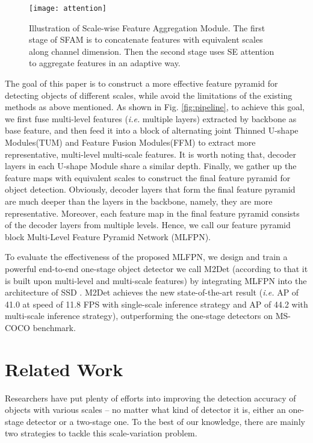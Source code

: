 \documentclass[letterpaper]{article} \usepackage{aaai18}  \usepackage{times}  \usepackage{helvet}  \usepackage{courier}  \usepackage{url}  \usepackage{graphicx}
\begin{document}
\begin{figure*}
\centering
\texttt{[image: attention]}
\caption{Illustration of Scale-wise Feature Aggregation Module. The first stage of SFAM is to concatenate features with equivalent scales along channel dimension. Then the second stage uses SE attention to aggregate features in an adaptive way.}
\label{fig:attention}
\end{figure*}


The goal of this paper is to construct a more effective feature pyramid for detecting objects of different scales, while avoid the limitations of the existing methods as above mentioned. As shown in Fig. \ref{fig:pipeline}, to achieve this goal, we first fuse multi-level features (\textit{i.e.} multiple layers) extracted by backbone as base feature, and then feed it into a block of alternating joint Thinned U-shape Modules(TUM) and Feature Fusion Modules(FFM) to extract more representative, multi-level multi-scale features. 
It is worth noting that, decoder layers in each U-shape Module share a similar depth. Finally, we gather up the feature maps with equivalent scales to construct the final feature pyramid for object detection. Obviously, decoder layers that form the final feature pyramid are much deeper than the layers in the backbone, namely, they are more representative. Moreover, each feature map in the final feature pyramid consists of the decoder layers from multiple levels. Hence, we call our feature pyramid block Multi-Level Feature Pyramid Network (MLFPN).

To evaluate the effectiveness of the proposed MLFPN, we design and train a powerful end-to-end one-stage object detector we call M2Det (according to that it is built upon multi-level and multi-scale features) by integrating MLFPN into the architecture of SSD \cite{LiuAESRFB16}. M2Det achieves the new state-of-the-art result (\textit{i.e.} AP of 41.0 at speed of 11.8 FPS with single-scale inference strategy and AP of 44.2 with multi-scale inference strategy), outperforming the one-stage detectors on MS-COCO \cite{LinMBHPRDZ14} benchmark.

\section{Related Work}
Researchers have put plenty of efforts into improving the detection accuracy of objects with various scales -- no matter what kind of detector it is, either an one-stage detector or a two-stage one. To the best of our knowledge, there are mainly two strategies to tackle this scale-variation problem.
\end{document}
